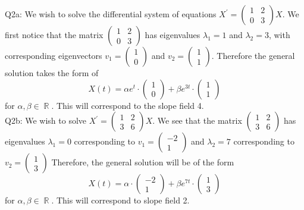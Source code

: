 \documentclass[letterpaper]{article}
\DeclareMathOperator{\R}{\mathbb{R}}
\begin{document}
\noindent Q2a: We wish to solve the differential system of equations $X^\prime = \begin{pmatrix}
    1 & 2 \\ 0 & 3
\end{pmatrix}X$. We first notice that the matrix $\begin{pmatrix}
    1 & 2 \\ 0 & 3
\end{pmatrix}$ has eigenvalues $\lambda_1 = 1$ and $\lambda_2=3$, with corresponding eigenvectors $v_1=\begin{pmatrix}
    1 \\ 0
\end{pmatrix}$ and $v_2 = \begin{pmatrix}
    1 \\ 1
\end{pmatrix}$. Therefore the general solution takes the form of $$X(t) = \alpha e^{t}\cdot \begin{pmatrix}
    1 \\ 0
\end{pmatrix} + \beta e^{3t} \cdot \begin{pmatrix}
    1\\ 1
\end{pmatrix}$$ for $\alpha,\beta \in \R$. This will correspond to the slope field 4. 
\newline \\ Q2b: We wish to solve $X^\prime = \begin{pmatrix}
    1 & 2 \\ 3 & 6
\end{pmatrix}X$. We see that the matrix $\begin{pmatrix}
    1 & 2 \\ 3 & 6
\end{pmatrix}$ has eigenvalues $\lambda_1=0$ corresponding to $v_1= \begin{pmatrix}
    -2 \\ 1
\end{pmatrix}$ and $\lambda_2=7$ corresponding to $v_2 = \begin{pmatrix}
    1\\3
\end{pmatrix}$ Therefore, the general solution will be of the form $$X(t) = \alpha \cdot \begin{pmatrix}
    -2\\1
\end{pmatrix} + \beta e^{7t}\cdot \begin{pmatrix}
    1\\3
\end{pmatrix}$$ for $\alpha,\beta\in \R$. This will correspond to slope field 2. 
\end{document}
